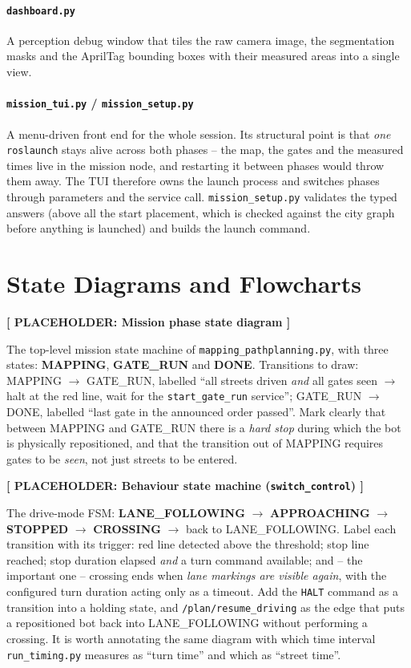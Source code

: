 \documentclass[10pt,a4paper]{article}
\newenvironment{placeholder}[1]
  {\par\medskip\noindent\begin{center}
   \setlength{\fboxsep}{6pt}%
   \begin{lrbox}{\placebox}%
   \begin{minipage}{0.88\linewidth}
   \centering\textbf{[ PLACEHOLDER: #1 ]}\\[0.8em]
   \raggedright\footnotesize}
  {\end{minipage}\end{lrbox}\fbox{\usebox{\placebox}}\end{center}\medskip}
\begin{document}
\paragraph{\texttt{dashboard.py}} A perception debug window that tiles the raw
camera image, the segmentation masks and the AprilTag bounding boxes with their
measured areas into a single view.

\paragraph{\texttt{mission\_tui.py} / \texttt{mission\_setup.py}} A menu-driven
front end for the whole session. Its structural point is that \emph{one}
\texttt{roslaunch} stays alive across both phases -- the map, the gates and the
measured times live in the mission node, and restarting it between phases would
throw them away. The TUI therefore owns the launch process and switches phases
through parameters and the service call. \texttt{mission\_setup.py} validates
the typed answers (above all the start placement, which is checked against the
city graph before anything is launched) and builds the launch command.

\section{State Diagrams and Flowcharts}

\begin{placeholder}{Mission phase state diagram}
  The top-level mission state machine of \texttt{mapping\_pathplanning.py}, with
  three states: \textbf{MAPPING}, \textbf{GATE\_RUN} and \textbf{DONE}.
  Transitions to draw: MAPPING $\rightarrow$ GATE\_RUN, labelled ``all streets
  driven \emph{and} all gates seen $\rightarrow$ halt at the red line, wait for
  the \texttt{start\_gate\_run} service''; GATE\_RUN $\rightarrow$ DONE,
  labelled ``last gate in the announced order passed''. Mark clearly that
  between MAPPING and GATE\_RUN there is a \emph{hard stop} during which the bot
  is physically repositioned, and that the transition out of MAPPING requires
  gates to be \emph{seen}, not just streets to be entered.
\end{placeholder}

\begin{placeholder}{Behaviour state machine (\texttt{switch\_control})}
  The drive-mode FSM: \textbf{LANE\_FOLLOWING} $\rightarrow$
  \textbf{APPROACHING} $\rightarrow$ \textbf{STOPPED} $\rightarrow$
  \textbf{CROSSING} $\rightarrow$ back to LANE\_FOLLOWING. Label each transition
  with its trigger: red line detected above the threshold; stop line reached;
  stop duration elapsed \emph{and} a turn command available; and -- the
  important one -- crossing ends when \emph{lane markings are visible again},
  with the configured turn duration acting only as a timeout. Add the
  \texttt{HALT} command as a transition into a holding state, and
  \texttt{/plan/resume\_driving} as the edge that puts a repositioned bot back
  into LANE\_FOLLOWING without performing a crossing. It is worth annotating the
  same diagram with which time interval \texttt{run\_timing.py} measures as
  ``turn time'' and which as ``street time''.
\end{placeholder}
\end{document}
